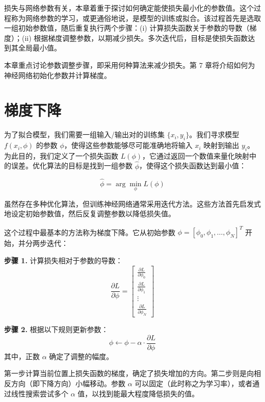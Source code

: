 \documentclass[lang=cn,newtx,10pt,scheme=chinese]{elegantbook}
\begin{document}
损失与网络参数有关，本章着重于探讨如何确定能使损失最小化的参数值。这个过程称为网络参数的学习，或更通俗地说，是模型的训练或拟合。该过程首先是选取一组初始参数值，随后重复执行两个步骤：(i) 计算损失函数关于参数的导数（梯度）；(ii) 根据梯度调整参数，以期减少损失。多次迭代后，目标是使损失函数达到其全局最小值。

本章重点讨论参数调整步骤，即采用何种算法来减少损失。第 7 章将介绍如何为神经网络初始化参数并计算梯度。

\section{梯度下降}
为了拟合模型，我们需要一组输入/输出对的训练集 \(\{x_i, y_i\}\)。我们寻求模型 \(f(x_i, \phi)\) 的参数 \(\phi\)，使得这些参数能够尽可能准确地将输入 \(x_i\) 映射到输出 \(y_i\)。为此目的，我们定义了一个损失函数 \(L(\phi)\)，它通过返回一个数值来量化映射中的误差。优化算法的目标是找到一组参数 \(\hat{\phi}\)，使得这个损失函数达到最小值：

\begin{equation}
\hat{\phi} = \arg\min_{\phi} L(\phi) 
\end{equation}


虽然存在多种优化算法，但训练神经网络通常采用迭代方法。这些方法首先启发式地设定初始参数值，然后反复调整参数以降低损失值。

这个过程中最基本的方法称为梯度下降。它从初始参数 \(\phi = [\phi_0, \phi_1, \ldots, \phi_N]^T\) 开始，并分两步迭代：

\textbf{步骤 1.} 计算损失相对于参数的导数：
\begin{equation}
\frac{\partial L}{\partial \phi} =
\begin{bmatrix}
\frac{\partial L}{\partial \phi_0}  \\
\frac{\partial L}{\partial \phi_1}  \\
\vdots  \\
\frac{\partial L}{\partial \phi_N} 
\end{bmatrix} 
\end{equation}

\textbf{步骤 2.} 根据以下规则更新参数：
\begin{equation}
\phi \leftarrow \phi - \alpha \cdot \frac{\partial L}{\partial \phi} 
\end{equation}
其中，正数 \(\alpha\) 确定了调整的幅度。

第一步计算当前位置上损失函数的梯度，确定了损失增加的方向。第二步则是向相反方向（即下降方向）小幅移动。参数 \(\alpha\) 可以固定（此时称之为学习率），或者通过线性搜索尝试多个 \(\alpha\) 值，以找到能最大程度降低损失的值。
\end{document}
